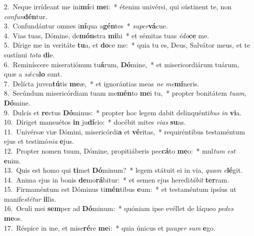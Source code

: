 {2.~}Neque irrídeant me ini\textbf{mí}ci \textbf{me}i:~* étenim univérsi, qui sústinent te, non \textit{con}\textit{fun}\textbf{dén}tur.\\
{3.~}Confundántur omnes i\textbf{ní}qua a\textbf{gén}tes~* \textit{su}\textit{per}\textbf{vá}cue.\\
{4.~}Vias tuas, Dómine, de\textbf{món}stra \textbf{mi}hi~* et sémitas tuas \textit{é}\textit{do}\textbf{ce} me.\\
{5.~}Dírige me in veritáte \textbf{tu}a, et \textbf{do}ce me:~* quia tu es, Deus, Salvátor meus, et te sustínui \textit{to}\textit{ta} \textbf{di}e.\\
{6.~}Reminíscere miseratiónum tu\textbf{á}rum, \textbf{Dó}mine,~* et misericordiárum tuárum, quæ a \textit{sǽ}\textit{cu}\textbf{lo} sunt.\\
{7.~}Delícta juven\textbf{tú}tis \textbf{me}æ,~* et ignorántias meas \textit{ne} \textit{me}\textbf{mí}neris.\\
{8.~}Secúndum misericórdiam tuam me\textbf{mén}to \textbf{me}i tu,~* propter bonitátem \textit{tu}\textit{am}, \textbf{Dó}mine.\\
{9.~}Dulcis et \textbf{re}ctus \textbf{Dó}minus:~* propter hoc legem dabit delinquénti\textit{bus} \textit{in} \textbf{vi}a.\\
{10.~}Díriget mansuétos \textbf{in} ju\textbf{dí}cio:~* docébit mites \textit{vi}\textit{as} \textbf{su}as.\\
{11.~}Univérsæ viæ Dómini, misericórdi\textbf{a} et \textbf{vé}ritas,~* requiréntibus testaméntum ejus et testimó\textit{ni}\textit{a} \textbf{e}jus.\\
{12.~}Propter nomen tuum, Dómine, propitiáberis pec\textbf{cá}to \textbf{me}o:~* mul\textit{tum} \textit{est} \textbf{e}nim.\\
{13.~}Quis est homo qui \textbf{ti}met \textbf{Dó}minum?~* legem státuit ei in via, \textit{quam} \textit{e}\textbf{lé}git.\\
{14.~}Anima ejus in bonis \textbf{de}mo\textbf{rá}bitur:~* et semen ejus heredi\textit{tá}\textit{bit} \textbf{ter}ram.\\
{15.~}Firmaméntum est Dóminus ti\textbf{mén}tibus \textbf{e}um:~* et testaméntum ipsíus ut manife\textit{sté}\textit{tur} \textbf{il}lis.\\
{16.~}Oculi mei \textbf{sem}per ad \textbf{Dó}minum:~* quóniam ipse evéllet de láqueo \textit{pe}\textit{des} \textbf{me}os.\\
{17.~}Réspice in me, et mise\textbf{ré}re \textbf{me}i:~* quia únicus et pau\textit{per} \textit{sum} \textbf{e}go.\\
